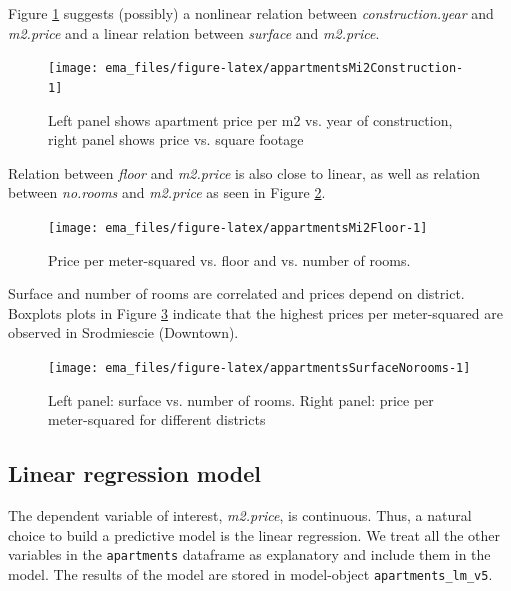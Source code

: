 \documentclass[]{krantz}
\begin{document}
Figure \ref{fig:appartmentsMi2Construction} suggests (possibly) a nonlinear relation between \emph{construction.year} and \emph{m2.price} and a linear relation between \emph{surface} and \emph{m2.price}.

\begin{figure}

{\centering \texttt{[image: ema\_files/figure-latex/appartmentsMi2Construction-1]} 

}

\caption{Left panel shows apartment price per m2 vs. year of construction, right panel shows price  vs. square footage}\label{fig:appartmentsMi2Construction}
\end{figure}

Relation between \emph{floor} and \emph{m2.price} is also close to linear, as well as relation between \emph{no.rooms} and \emph{m2.price} as seen in Figure \ref{fig:appartmentsMi2Floor}.

\begin{figure}

{\centering \texttt{[image: ema\_files/figure-latex/appartmentsMi2Floor-1]} 

}

\caption{Price per meter-squared vs. floor and vs. number of rooms.}\label{fig:appartmentsMi2Floor}
\end{figure}

Surface and number of rooms are correlated and prices depend on district. Boxplots plots in Figure \ref{fig:appartmentsSurfaceNorooms} indicate that the highest prices per meter-squared are observed in Srodmiescie (Downtown).

\begin{figure}

{\centering \texttt{[image: ema\_files/figure-latex/appartmentsSurfaceNorooms-1]} 

}

\caption{Left panel: surface vs. number of rooms. Right panel: price per meter-squared for different districts}\label{fig:appartmentsSurfaceNorooms}
\end{figure}

\hypertarget{model-Apartments-lr}{%
\subsection{Linear regression model}\label{model-Apartments-lr}}

The dependent variable of interest, \emph{m2.price}, is continuous. Thus, a natural choice to build a predictive model is the linear regression. We treat all the other variables in the \texttt{apartments} dataframe as explanatory and include them in the model. The results of the model are stored in model-object \texttt{apartments\_lm\_v5}.
\end{document}
